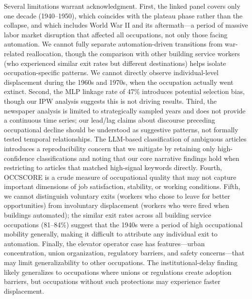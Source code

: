 \documentclass[12pt]{article}
\begin{document}
Several limitations warrant acknowledgment. First, the linked panel covers only one decade (1940--1950), which coincides with the plateau phase rather than the collapse, and which includes World War II and its aftermath---a period of massive labor market disruption that affected all occupations, not only those facing automation. We cannot fully separate automation-driven transitions from war-related reallocation, though the comparison with other building service workers (who experienced similar exit rates but different destinations) helps isolate occupation-specific patterns. We cannot directly observe individual-level displacement during the 1960s and 1970s, when the occupation actually went extinct. Second, the MLP linkage rate of 47\% introduces potential selection bias, though our IPW analysis suggests this is not driving results. Third, the newspaper analysis is limited to strategically sampled years and does not provide a continuous time series; our lead/lag claims about discourse preceding occupational decline should be understood as suggestive patterns, not formally tested temporal relationships. The LLM-based classification of ambiguous articles introduces a reproducibility concern that we mitigate by retaining only high-confidence classifications and noting that our core narrative findings hold when restricting to articles that matched high-signal keywords directly. Fourth, OCCSCORE is a crude measure of occupational quality that may not capture important dimensions of job satisfaction, stability, or working conditions. Fifth, we cannot distinguish voluntary exits (workers who chose to leave for better opportunities) from involuntary displacement (workers who were fired when buildings automated); the similar exit rates across all building service occupations (81--84\%) suggest that the 1940s were a period of high occupational mobility generally, making it difficult to attribute any individual exit to automation. Finally, the elevator operator case has features---urban concentration, union organization, regulatory barriers, and safety concerns---that may limit generalizability to other occupations. The institutional-delay finding likely generalizes to occupations where unions or regulations create adoption barriers, but occupations without such protections may experience faster displacement.


\end{document}
